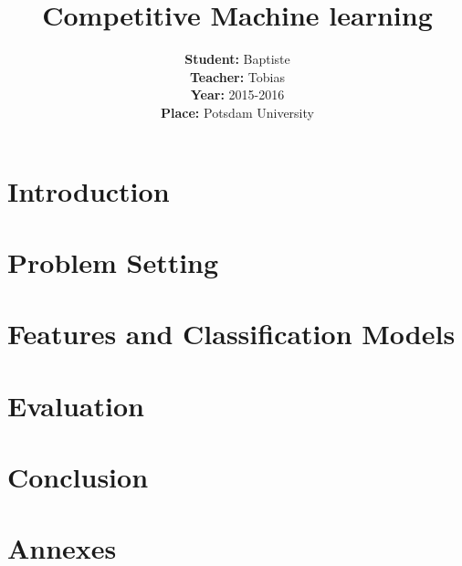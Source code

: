 \documentclass[12pt,twoside]{scrreprt}
\title{Competitive Machine learning}
\author{\textbf{Student:} Baptiste \bsc{O'Jeanson} \\
	\textbf{Teacher:} Tobias \bsc{Scheffer}\\
	\textbf{Year:} 2015-2016\\
	\textbf{Place:} Potsdam University\\}
\begin{document}

\tableofcontents

\chapter{Introduction}


\chapter{Problem Setting}


\chapter{Features and Classification Models}


\chapter{Evaluation}


\chapter{Conclusion}


%
\printbibliography

\clearpage
\appendix
\chapter{Annexes}

\end{document}
